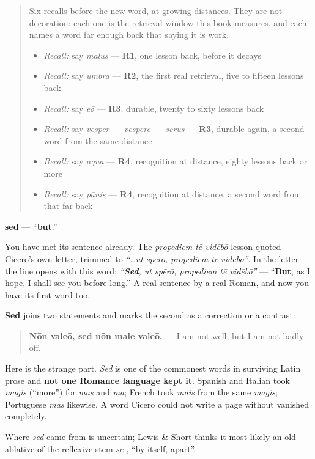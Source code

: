\begin{quote}
Six recalls before the new word, at growing distances. They are not decoration: each one is the retrieval window this book measures, and each names a word far enough back that saying it is work.

\begin{itemize}
\raggedright
  \item \emph{Recall:} say \emph{malus} — \textbf{R1}, one lesson back, before it decays
  \item \emph{Recall:} say \emph{umbra} — \textbf{R2}, the first real retrieval, five to fifteen lessons back
  \item \emph{Recall:} say \emph{eō} — \textbf{R3}, durable, twenty to sixty lessons back
  \item \emph{Recall:} say \emph{vesper — vespere — sērus} — \textbf{R3}, durable again, a second word from the same distance
  \item \emph{Recall:} say \emph{aqua} — \textbf{R4}, recognition at distance, eighty lessons back or more
  \item \emph{Recall:} say \emph{pānis} — \textbf{R4}, recognition at distance, a second word from that far back
\end{itemize}
\end{quote}

\begin{cousinweb}
\textbf{sed} — \textquotedblleft{}\textbf{but}.\textquotedblright{}

You have met its sentence already. The \emph{propediem tē vidēbō} lesson quoted Cicero's own letter, trimmed to \emph{\textquotedblleft{}…ut spērō, propediem tē vidēbō\textquotedblright{}}. In the letter the line opens with this word: \emph{\textquotedblleft{}\textbf{Sed}, ut spērō, propediem tē vidēbō\textquotedblright{}} — \textquotedblleft{}\textbf{But}, as I hope, I shall see you before long.\textquotedblright{} A real sentence by a real Roman, and now you have its first word too.

\textbf{Sed} joins two statements and marks the second as a correction or a contrast:

\begin{quote}
\textbf{Nōn valeō, sed nōn male valeō.} — I am not well, but I am not badly off.
\end{quote}

Here is the strange part. \emph{Sed} is one of the commonest words in surviving Latin prose and \textbf{not one Romance language kept it}. Spanish and Italian took \emph{magis} (\textquotedblleft{}more\textquotedblright{}) for \emph{mas} and \emph{ma}; French took \emph{mais} from the same \emph{magis}; Portuguese \emph{mas} likewise. A word Cicero could not write a page without vanished completely.

Where \emph{sed} came from is uncertain; Lewis \& Short thinks it most likely an old ablative of the reflexive stem \emph{se-}, \textquotedblleft{}by itself, apart\textquotedblright{}.
\end{cousinweb}

